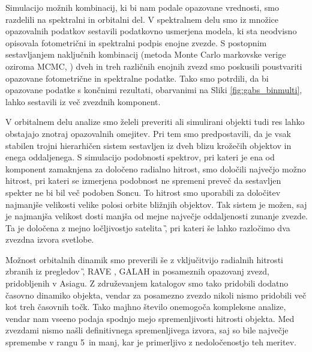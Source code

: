 Simulacijo možnih kombinacij, ki bi nam podale opazovane vrednosti, smo razdelili na spektralni in orbitalni del. V spektralnem delu smo iz množice opazovalnih podatkov sestavili podatkovno usmerjena modela, ki sta neodvisno opisovala fotometrični in spektralni podpis enojne zvezde. S postopnim sestavljanjem naključnih kombinacij (metoda Monte Carlo markovske verige oziroma MCMC, \cite{2013PASP..125..306F}) dveh in treh različnih enojnih zvezd smo poskusili poustvariti opazovane fotometrične in spektralne podatke. Tako smo potrdili, da bi opazovane podatke s končnimi rezultati, obarvanimi na Sliki \ref{fig:gabs_binmulti}, lahko sestavili iz več zvezdnih komponent.

V orbitalnem delu analize smo želeli preveriti ali simulirani objekti tudi res lahko obstajajo znotraj opazovalnih omejitev. Pri tem smo predpostavili, da je vsak stabilen trojni hierarhičen sistem sestavljen iz dveh blizu krožečih objektov in enega oddaljenega. S simulacijo podobnosti spektrov, pri kateri je ena od komponent zamaknjena za določeno radialno hitrost, smo določili največjo možno hitrost, pri kateri se izmerjena podobnost ne spremeni preveč da sestavljen spekter ne bi bil več podoben Soncu. To hitrost smo uporabili za določitev najmanjše velikosti velike polosi orbite bližnjih objektov. Tak sistem je možen, saj je najmanjša velikost dosti manjša od mejne največje oddaljenosti zunanje zvezde. Ta je določena z mejno ločljivostjo satelita \G, pri kateri še lahko razločimo dva zvezdna izvora svetlobe.

Možnost orbitalnih dinamik smo preverili še z vključitvijo radialnih hitrosti zbranih iz pregledov \G, RAVE \cite{2017AJ....153...75K}, GALAH in posameznih opazovanj zvezd, pridobljenih v Asiagu. Z združevanjem katalogov smo tako pridobili dodatno časovno dinamiko objekta, vendar za posamezno zvezdo nikoli nismo pridobili več kot treh časovnih točk. Tako majhno število onemogoča kompleksne analize, vendar nam vseeno podaja spodnjo mejo spremenljivosti hitrosti objekta. Med zvezdami nismo našli definitivnega spremenljivega izvora, saj so bile največje spremembe v rangu 5~\kms in manj, kar je primerljivo z nedoločenostjo teh meritev.

